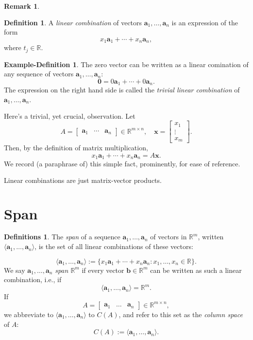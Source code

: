 \documentclass[12pt]{amsart}
\newcommand{\RR}{\mathbb{R}}
\theoremstyle{definition} \newtheorem{definition}[theorem]{Definition}
\newtheorem{definitions}[theorem]{Definitions}
\newtheorem{remark}[theorem]{Remark} \newtheorem{remarks}[theorem]{Remarks}
\newtheorem{exdef}[theorem]{Example-Definition}
\newcommand{\ba}{\mathbf{a}}
\newcommand{\bb}{\mathbf{b}}
\newcommand{\bx}{\mathbf{x}}
\newcommand{\bzero}{\mathbf{0}}
\newcommand{\bas}{\ba_1,\ldots,\ba_n}
\newcommand{\mat}[1]{\begin{bmatrix}#1\end{bmatrix}}
\begin{document}
\begin{remark}
\begin{definition}\label{df:lc_span} A \emph{linear combination} of vectors
$\bas$ is an expression of the form \[ x_1\ba_1+\cdots +x_n\ba_n, \] where
$t_j\in \RR$.  \end{definition}

\begin{exdef}\label{exdef:trivial_lc} The zero vector can be written as a
	linear comination of any sequence of vectors $\bas$: \[ \bzero = 0\ba_1
	+ \cdots + 0\ba_n.  \] The expression on the right hand side is called
	the \emph{trivial linear combination} of $\bas$.  \end{exdef}

Here's a trivial, yet crucial, observation. Let \[
A=\mat{\ba_1&\cdots&\ba_n}\in\RR^{m\times n}, \quad \bx=\mat{x_1\\\vdots\\x_m}.
\] Then, by the definition of matrix multiplication, \[ x_1\ba_1+\cdots +
x_n\ba_n = A\bx.  \] We record (a paraphrase of) this simple fact, prominently,
for ease of reference.

\begin{keyfact}\label{kf:lc_matvec} Linear combinations are just matrix-vector
products.  \end{keyfact}


\section{Span}

\begin{definitions} The \emph{span} of a sequence $\bas$ of vectors in $\RR^m$,
	written $\langle \bas\rangle$, is the set of all linear combinations of
	these vectors:
	
	\[ \langle \bas \rangle := \{x_1\ba_1+\cdots + x_n\ba_n
		: x_1,\ldots,x_n\in\RR\}.  \] We say $\bas$ \emph{span $\RR^m$}
		if every vector $\bb\in\RR^m$ can be written as such a linear
		combination, i.e., if \[ \langle \ba_1,\ldots,\ba_n\rangle =
			\RR^m.  \] If \[
			A=\mat{\ba_1&\ldots&\ba_n}\in\RR^{m\times n}, \] we
		abbreviate to $\langle \ba_1,\ldots,\ba_n\rangle$ to $C(A)$,
	and refer to this set as the \emph{column space} of $A$: \[ C(A) :=
\langle \ba_1,\ldots,\ba_n\rangle.  \] \end{definitions}


\end{remark}
\end{document}
